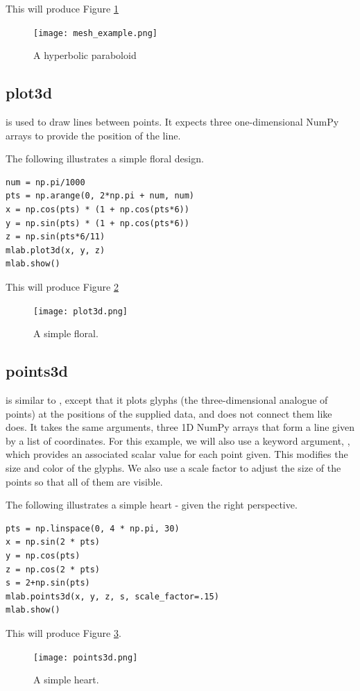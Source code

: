 This will produce Figure \ref{fig:mesh_example}
\begin{figure}
\texttt{[image: mesh\_example.png]}
\caption{A hyperbolic paraboloid}
\label{fig:mesh_example}
\end{figure}

\subsection*{plot3d}
 is used to draw lines between points.
It expects three one-dimensional NumPy arrays to provide the position of the line.


The following illustrates a simple floral design.
\begin{lstlisting}
num = np.pi/1000
pts = np.arange(0, 2*np.pi + num, num)
x = np.cos(pts) * (1 + np.cos(pts*6))
y = np.sin(pts) * (1 + np.cos(pts*6))
z = np.sin(pts*6/11)
mlab.plot3d(x, y, z)
mlab.show()
\end{lstlisting}
This will produce Figure \ref{fig:plot3d}
\begin{figure}
\texttt{[image: plot3d.png]}
\caption{A simple floral.}
\label{fig:plot3d}
\end{figure}


\subsection*{points3d}
 is similar to , except that it plots glyphs (the three-dimensional analogue of points) at the positions of the supplied data, and does not connect them like  does.
It takes the same arguments, three 1D NumPy arrays that form a line given by a list of  coordinates.
For this example, we will also use a keyword argument, , which provides an associated scalar value for each point given.
This modifies the size and color of the glyphs.
We also use a scale factor to adjust the size of the points so that all of them are visible.

The following illustrates a simple heart - given the right perspective.
\begin{lstlisting}
pts = np.linspace(0, 4 * np.pi, 30)
x = np.sin(2 * pts)
y = np.cos(pts)
z = np.cos(2 * pts)
s = 2+np.sin(pts)
mlab.points3d(x, y, z, s, scale_factor=.15)
mlab.show()
\end{lstlisting}
This will produce Figure \ref{fig:points3d}.

\begin{figure}
\texttt{[image: points3d.png]}
\caption{A simple heart.}
\label{fig:points3d}
\end{figure}

